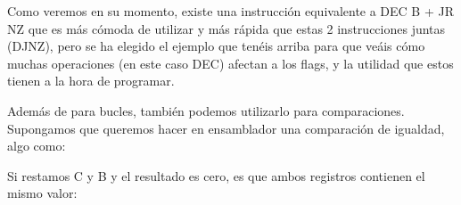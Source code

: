 \documentclass[letterpaper,10pt,spanish]{sphinxmanual}
\begin{document}
Como veremos en su momento, existe una instrucción equivalente a DEC B + JR NZ que es más cómoda de utilizar y más rápida que estas 2 instrucciones juntas (DJNZ), pero se ha elegido el ejemplo que tenéis arriba para que veáis cómo muchas operaciones (en este caso DEC) afectan a los flags, y la utilidad que estos tienen a la hora de programar.

Además de para bucles, también podemos utilizarlo para comparaciones. Supongamos que queremos hacer en ensamblador una comparación de igualdad, algo como:

\begin{sphinxVerbatim}[commandchars=\\\{\}]
\end{sphinxVerbatim}

Si restamos C y B y el resultado es cero, es que ambos registros contienen el mismo valor:

\begin{sphinxVerbatim}[commandchars=\\\{\}]
                

                 
         
     

\end{sphinxVerbatim}
\end{document}
